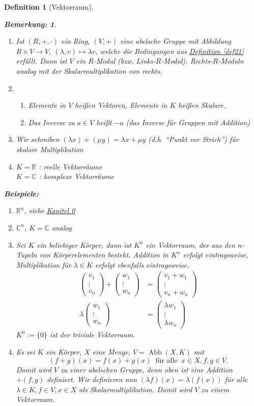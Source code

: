 \documentclass{report}
\newcommand{\lb}{\lambda}
\newcommand{\R}{\mathbb{R}}
\newcommand{\C}{\mathbb{C}}
\newcommand{\mRn}{$\mathbb{R}^n$}
\newcommand{\ve}[1]{{\begin{pmatrix}#1 \end{pmatrix}}}
\renewcommand{\v}{\ve}
\DeclareMathOperator{\abb}{Abb}
\theoremstyle{customrem}
\newtheorem*{bem}{Bemerkung\textnormal:}
\theoremstyle{customdef}
\newtheorem{definition}{Definition}[chapter]
\begin{document}
\begin{definition}[Vektorraum]
		\begin{bem}$ $
			\begin{enumerate}
				\item Ist $(R, +, \cdot)$ ein Ring, $(V, +)$ eine abelsche Gruppe mit Abbildung $R \times V \to V$, $(\lb, v) \mapsto \lb v$, welche die Bedingungen aus \hyperref[def21]{Definition \ref{def21}} erfüllt. Dann ist $V$ ein $R$-Modul (bzw. Links-$R$-Modul).	Rechts-$R$-Moduln analog mit der Skalarmultiplikation von rechts.
				\item
					\begin{enumerate}
						\item Elemente in $V$ heißen Vektoren, Elemente in $K$ heißen Skalare.
						\item Das Inverse zu $a \in V$ heißt $-a$ (das Inverse für Gruppen mit Addition)
					\end{enumerate}
				\item Wir schreiben $(\lb x) + (\mu y) = \lb x + \mu y$ (d.h. "`Punkt vor Strich"') für skalare Multiplikation
				\item
					$K = \R$ : reelle Vektorräume\\
					$K = \C$ : komplexe Vektorräume
			\end{enumerate}
		\end{bem}
		\noindent
		\textbf{Beispiele:}
		\begin{enumerate}
			\item \mRn, siehe \hyperref[kap0]{Kapitel 0}
			\item $\C^n$, $K = \C$ analog
			\item Sei $K$ ein beliebiger Körper, dann ist $K^n$ ein Vektorraum, der aus den $n$-Tupeln von Körperelementen besteht. Addition in $K^n$ erfolgt eintragsweise, Multiplikation für $\lb \in K$ erfolgt ebenfalls eintragsweise.
			\begin{align*}
				\v{v_1\\ \vdots\\ v_n} + \v{w_1\\ \vdots\\ w_n} &= \v{v_1 + w_1\\ \vdots \\ v_n + w_n}\\[1em]
				\lb \v{w_1\\ \vdots\\ w_n} &= \v{\lb w_1\\ \vdots \\ \lb w_n}
			\end{align*}
			$K^0 := \{0\}$ ist der triviale Vektorraum.
			\item Es sei $K$ ein Körper, $X$ eine Menge, $V = \abb(X, K)$ mit
				$$(f + g)(x) = f(x) + g(x)\ \text{ für alle }\ x \in X, f, g \in V.$$
				Damit wird $V$ zu einer abelschen Gruppe, denn oben ist eine Addition $+(f, g)$ definiert. Wir definieren nun $(\lb f)(x) = \lb (f(x))$ für alle $\lb \in K, f \in V, x \in X$ als Skalarmultiplikation. Damit wird $V$ zu einem Vektorraum.
		\end{enumerate}
	\end{definition}
\end{document}
